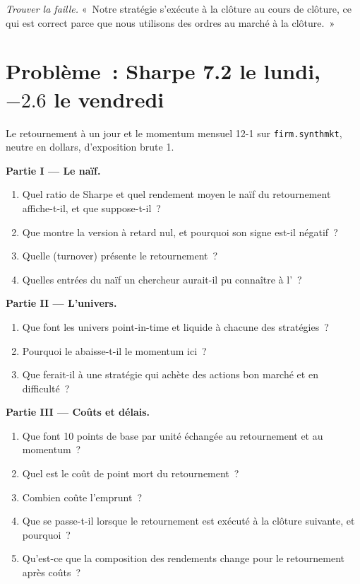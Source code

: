 \begin{exercise}[$\star\star\star$]\label{exo:rs:vectorised-backtests:8}
\emph{Trouver la faille.} «~Notre stratégie s'exécute à la clôture au cours de clôture, ce qui est correct parce que nous utilisons des ordres au marché à la clôture.~»
\end{exercise}

\section{Problème~: Sharpe 7.2 le lundi, $-2.6$ le vendredi}

\begin{problem}\label{pb:rs:vectorised-backtests:1}
Le retournement à un jour et le momentum mensuel 12-1 sur \texttt{firm.synthmkt}, neutre en dollars, d'exposition brute 1.

\medskip\noindent\textbf{Partie I --- Le  naïf.}
\begin{enumerate}
\item Quel ratio de Sharpe et quel rendement moyen le  naïf du retournement affiche-t-il, et que suppose-t-il~?
\item Que montre la version à retard nul, et pourquoi son signe est-il négatif~?
\item Quelle  (turnover) présente le retournement~?
\item Quelles entrées du  naïf un chercheur aurait-il pu connaître à l'~?
\end{enumerate}

\medskip\noindent\textbf{Partie II --- L'univers.}
\begin{enumerate}[resume]
\item Que font les univers point-in-time et liquide à chacune des stratégies~?
\item Pourquoi le  abaisse-t-il le momentum ici~?
\item Que ferait-il à une stratégie qui achète des actions bon marché et en difficulté~?
\end{enumerate}

\medskip\noindent\textbf{Partie III --- Coûts et délais.}
\begin{enumerate}[resume]
\item Que font 10 points de base par unité échangée au retournement et au momentum~?
\item Quel est le coût de point mort du retournement~?
\item Combien coûte l'emprunt~?
\item Que se passe-t-il lorsque le retournement est exécuté à la clôture suivante, et pourquoi~?
\item Qu'est-ce que la composition des rendements change pour le retournement après coûts~?
\end{enumerate}


\end{problem}
